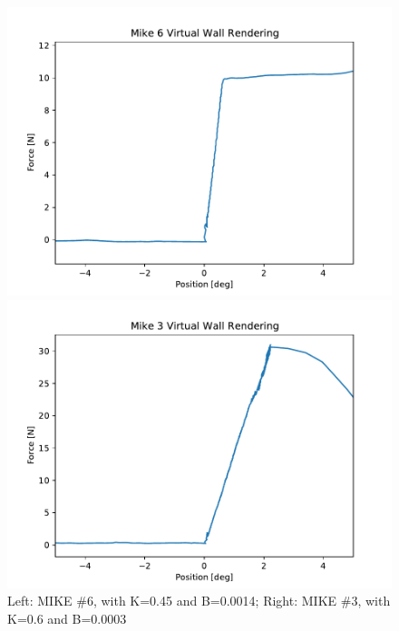 \begin{figure}[h]
    \begin{minipage}[m]{0.5\textwidth}
     \centering
        \includegraphics[width = \textwidth]{chapters/kb_plot/Mike6_VirtualWall.pdf}
    \end{minipage}
    \hfill
    \begin{minipage}[m]{0.5\textwidth}
     \centering
        \includegraphics[width = \textwidth]{chapters/kb_plot/Mike3_VirtualWall.pdf}
    \end{minipage}
    \caption{Left: MIKE \#6, with K=0.45 and B=0.0014; Right: MIKE \#3, with K=0.6 and B=0.0003}
\end{figure}